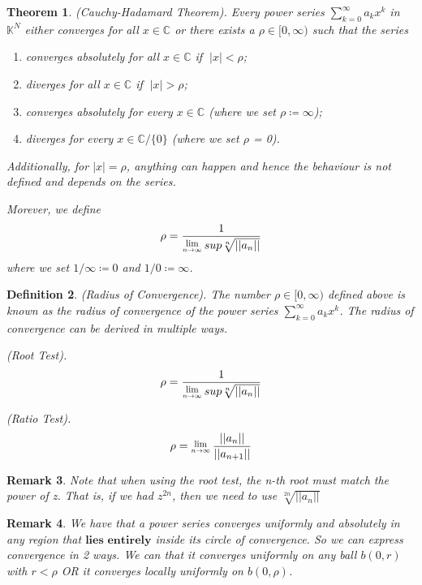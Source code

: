 \documentclass[twoside]{article}
\newcounter{lecnum}
\newcommand{\Lim}[1]{\raisebox{0.5ex}{\scalebox{0.8}{$\displaystyle \lim_{#1}\;$}}}
\newtheorem{theorem}{Theorem}[lecnum]
\newtheorem{remark}[theorem]{Remark}
\newtheorem{definition}[theorem]{Definition}
\begin{document}
\begin{theorem}(Cauchy-Hadamard Theorem). Every power series $\sum_{k=0}^{\infty}a_kx^k $ in $\mathbb{K}^N$ either converges for all $x \in \mathbb{C}$ or there exists a $\rho \in [0,\infty)$ such that the series 
\begin{enumerate}
    \item converges absolutely for all $x \in \mathbb{C} $ if $\; |x| < \rho$;
    \item diverges for all $x \in \mathbb{C}$ if $\;|x| > \rho$;
    \item converges absolutely for every $x \in \mathbb{C}$ (where we set $\rho \coloneqq \infty$);
    \item diverges for every $x \in \mathbb{C} /\{0\}$ (where we set $\rho$ = 0).
\end{enumerate}

Additionally, for $|x| = \rho$, anything can happen and hence the behaviour is not defined and depends on the series.

Morever, we define
$$
\rho = \frac{1}{\Lim{n \rightarrow \infty}sup\sqrt[n]{||a_n||}}
$$
where we set $1/\infty \coloneqq 0$ and $1/0 \coloneqq \infty$.
\end{theorem}

\begin{definition}(Radius of Convergence). The number $\rho \in [0,\infty)$ defined above is known as the radius of convergence of the power series $\sum_{k=0}^{\infty}a_kx^k$. The radius of convergence can be derived in multiple ways.

(Root Test).
$$
\rho = \frac{1}{\Lim{n \rightarrow \infty}sup\sqrt[n]{||a_n||}}
$$

(Ratio Test).
$$
\rho = \Lim{n \rightarrow \infty}\frac{||a_n||}{||a_{n+1}||}
$$

\end{definition}

\begin{remark} Note that when using the root test, the n-th root must match the power of z. That is, if we had $z^{2n}$, then we need to use $\sqrt[2n]{||a_n||}$
\end{remark}


\begin{remark} We have that a power series converges uniformly and absolutely in any region that $\textbf{lies entirely}$ inside its circle of convergence. So we can express convergence in 2 ways. We can that it converges uniformly on any ball $b(0,r)$ with $r < \rho$ OR it converges locally uniformly on $b(0,\rho)$.
\end{remark}
\end{document}

